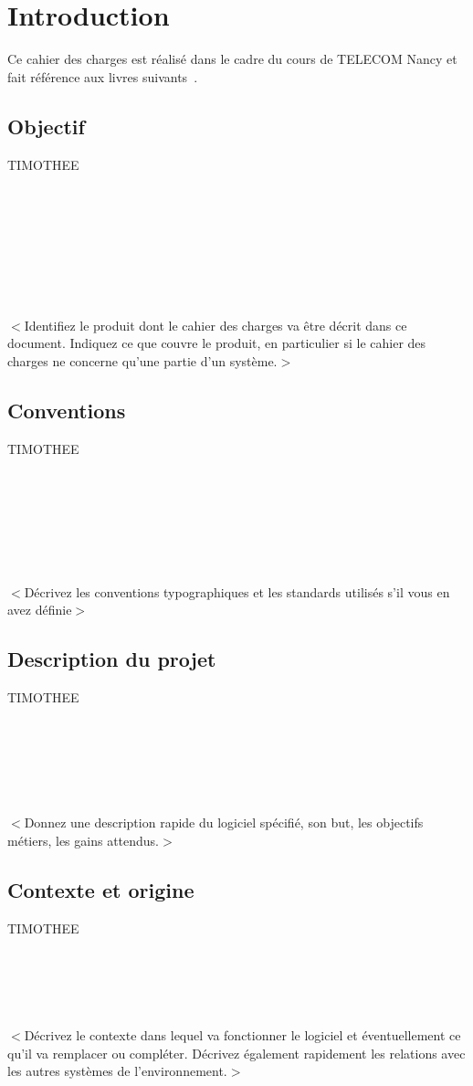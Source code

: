 \chapter{Introduction}
Ce cahier des charges est réalisé dans le cadre du cours de TELECOM Nancy  et fait référence aux livres suivants~\cite{Sommerville:2010:SE:1841764,Pohl:2010:REF:1869735,Rumbaugh:2004:UML:993859}.
\section{Objectif}
TIMOTHEE\\\\\\\\\\\\\\\\\\
$<$Identifiez le produit dont le cahier des charges va être décrit dans ce document. Indiquez ce que couvre le produit, en particulier si le cahier des charges ne concerne qu'une partie d'un système.$>$

\section{Conventions}
TIMOTHEE\\\\\\\\\\\\\\\\
$<$Décrivez les conventions typographiques et les standards utilisés s'il vous en avez définie$>$

\section{Description du projet}
TIMOTHEE\\\\\\\\\\\\\\
$<$Donnez une description rapide du logiciel spécifié, son but, les objectifs métiers, les gains attendus.$>$


\section{Contexte et origine}
TIMOTHEE\\\\\\\\\\\\
$<$Décrivez le contexte dans lequel va fonctionner le logiciel et éventuellement ce qu'il va remplacer ou compléter. Décrivez également rapidement les relations avec les autres systèmes de l'environnement.$>$

